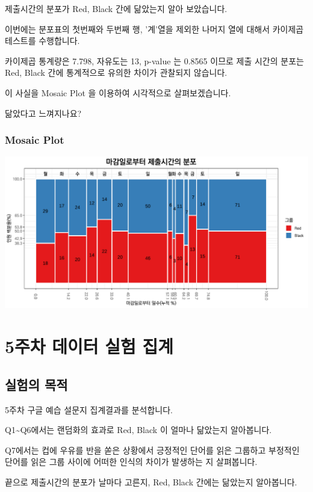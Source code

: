 \documentclass[
]{book}
\begin{document}
제출시간의 분포가 Red, Black 간에 닮았는지 알아 보았습니다.

이번에는 분포표의 첫번째와 두번째 행, '계'열을 제외한 나머지 열에 대해서 카이제곱테스트를 수행합니다.

카이제곱 통계량은 7.798, 자유도는 13, p-value 는 0.8565 이므로 제출 시간의 분포는 Red, Black 간에 통계적으로 유의한 차이가 관찰되지 않습니다.

이 사실을 Mosaic Plot 을 이용하여 시각적으로 살펴보겠습니다.

닮았다고 느껴지나요?

\subsection{Mosaic Plot}\label{mosaic-plot-7}

\includegraphics{_main_files/figure-latex/unnamed-chunk-100-1.pdf}

\chapter{5주차 데이터 실험 집계}\label{uxc8fcuxcc28-uxb370uxc774uxd130-uxc2e4uxd5d8-uxc9d1uxacc4-4}

\section{실험의 목적}\label{uxc2e4uxd5d8uxc758-uxbaa9uxc801-4}

5주차 구글 예습 설문지 집계결과를 분석합니다.

Q1\textasciitilde Q6에서는 랜덤화의 효과로 Red, Black 이 얼마나 닮았는지 알아봅니다.

Q7에서는 컵에 우유를 반을 쏟은 상황에서 긍정적인 단어를 읽은 그룹하고 부정적인 단어를 읽은 그룹 사이에 어떠한 인식의 차이가 발생하는 지 살펴봅니다.

끝으로 제출시간의 분포가 날마다 고른지, Red, Black 간에는 닮았는지 알아봅니다.
\end{document}

